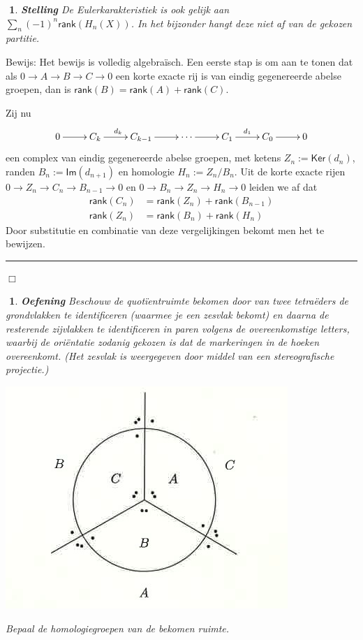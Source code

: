 \documentclass[12pt]{book}
\newcommand{\bew}{{\sc Bewijs: }}
\newcommand{\B}{\rule{1mm}{0mm} \hfill $\Box$ }
\newtheorem{stelh}{$\!\!$}[section]
\newenvironment{stel}{\begin{stelh}{\em {\bf Stelling }}}{\end{stelh}}
\newtheorem{eoef}{$\!\!$}[chapter]
\newenvironment{oef}{\begin{eoef} {\bf Oefening}}{\end{eoef}}
\begin{document}
\begin{stel}
De Eulerkarakteristiek is ook gelijk aan $\sum_n (-1)^n \mathsf{rank}(H_n(X))$.
In het bijzonder hangt deze niet af van de gekozen partitie.
\end{stel}

\bew
Het bewijs is volledig algebra\"isch. Een eerste stap is om aan te tonen dat als $0 \to A \to B \to C \to 0$ een korte exacte rij is van eindig gegenereerde abelse groepen, dan is $\mathsf{rank} (B) =  \mathsf{rank}(A) + \mathsf{rank}(C)$.

Zij nu 
$$
\xymatrix{
0 \ar[r] & C_k  \ar[r]^{d_k} & C_{k-1} \ar[r] & \cdots \ar[r] & C_1 \ar[r]^{d_1} & C_0 \ar[r] & 0
 }
$$
een complex van eindig gegenereerde abelse groepen, met ketens $Z_n := \mathsf{Ker}(d_n)$, randen $B_n := \mathsf{Im} (d_{n+1})$ en homologie $H_n := Z_n / B_n$. Uit de korte  exacte rijen $0 \to Z_n \to C_n \to B_{n-1} \to 0$ en $0 \to B_n \to Z_n \to H_n \to 0$ leiden we af dat 
\begin{align*}
\mathsf{rank}(C_n) &= \mathsf{rank}(Z_n) + \mathsf{rank} (B_{n-1}) \\
\mathsf{rank}(Z_n) &= \mathsf{rank}(B_n) + \mathsf{rank} (H_{n}) 
\end{align*}
Door substitutie en combinatie van deze vergelijkingen bekomt men het te bewijzen.
\B


\begin{oef}
Beschouw de quot\"ientruimte bekomen door van twee tetra\"eders de grondvlakken te identificeren (waarmee je een zesvlak bekomt) en daarna de resterende zijvlakken te identificeren in paren volgens de overeenkomstige letters, waarbij de ori\"entatie zodanig gekozen is dat de markeringen in de hoeken overeenkomt. (Het zesvlak is weergegeven door middel van een stereografische projectie.)
\begin{center}
\includegraphics[scale=0.37]{images/diagram.png}
\end{center}
Bepaal de homologiegroepen van de bekomen ruimte.
\end{oef}
\end{document}
